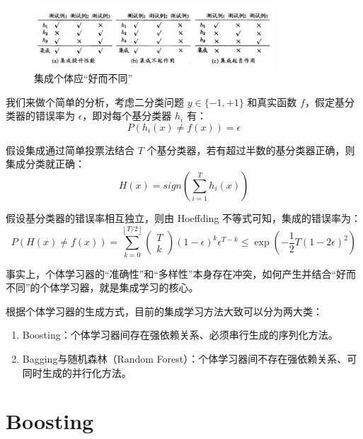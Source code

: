 \documentclass[12pt, a4paper]{article} %
\begin{document}
\begin{figure}[H]
    \centering
    \includegraphics[width=0.8\textwidth]{../img/8-2-集成个体应“好而不同”.png}
    \caption{集成个体应“好而不同”}
    \label{fig:集成个体应“好而不同”}
\end{figure}

我们来做个简单的分析，考虑二分类问题 $y \in \{-1, +1\}$ 和真实函数 $f$，假定基分类器的错误率为 $\epsilon$，即对每个基分类器 $h_i$ 有：
\begin{equation*}
    P(h_i (x) \ne f(x)) = \epsilon
\end{equation*}

假设集成通过简单投票法结合 $T$ 个基分类器，若有超过半数的基分类器正确，则集成分类就正确：
\begin{equation*}
    H(x) = sign(\sum_{i = 1}^{T} h_i (x))
\end{equation*}

假设基分类器的错误率相互独立，则由 Hoeffding 不等式可知，集成的错误率为：
\begin{equation*}
    P(H(x) \ne f(x)) = \sum_{k = 0}^{\left \lfloor T / 2 \right \rfloor} \begin{pmatrix}
        T \\
        k
        \end{pmatrix} (1 - \epsilon)^{k} \epsilon^{T - k} \le \exp( - \frac{1}{2} T (1 - 2 \epsilon)^2)
\end{equation*}

事实上，个体学习器的“准确性”和“多样性”本身存在冲突，如何产生并结合“好而不同”的个体学习器，就是集成学习的核心。

根据个体学习器的生成方式，目前的集成学习方法大致可以分为两大类：
\begin{enumerate}[\hspace*{2em} i.]
    \item Boosting：个体学习器间存在强依赖关系、必须串行生成的序列化方法。
    \item Bagging与随机森林（Random Forest）：个体学习器间不存在强依赖关系、可同时生成的并行化方法。
\end{enumerate}

\section{Boosting}
\end{document}
